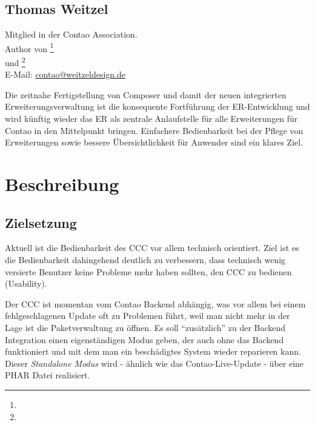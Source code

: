 \documentclass[
paper=a4,
draft=false,%
fontsize=10pt%
]{scrartcl}
\begin{document}
\subsection*{Thomas  Weitzel}

Mitglied in der Contao Association.\\
Author von \footnote{} \\
und \footnote{} \\
E-Mail: \href{mailto:contao@weitzeldesign.de}{contao@weitzeldesign.de}

Die zeitnahe Fertigstellung von Composer und damit der neuen integrierten Erweiterungsverwaltung ist die konsequente Fortführung der ER-Entwicklung und wird künftig wieder das ER als zentrale Anlaufstelle für alle Erweiterungen für Contao in den Mittelpunkt bringen. Einfachere Bedienbarkeit bei der Pflege von Erweiterungen sowie bessere Übersichtlichkeit für Anwender sind ein klares Ziel.

\newpage

%
%

\section{Beschreibung}
\label{sec:description}

\subsection{Zielsetzung}

Aktuell ist die Bedienbarkeit des CCC vor allem technisch orientiert. Ziel ist es die Bedienbarkeit dahingehend deutlich zu verbessern, dass technisch wenig versierte Benutzer keine Probleme mehr haben sollten, den CCC zu bedienen (Usability).

Der CCC ist momentan vom Contao Backend abhängig, was vor allem bei einem fehlgeschlagenen Update oft zu Problemen führt, weil man nicht mehr in der Lage ist die Paketverwaltung zu öffnen. Es soll “zusätzlich” zu der Backend Integration einen eigenständigen Modus geben, der auch ohne das Backend funktioniert und mit dem man ein beschädigtes System wieder reparieren kann. Dieser \textit{Standalone Modus} wird - ähnlich wie das Contao-Live-Update - über eine PHAR Datei realisiert.
\end{document}
